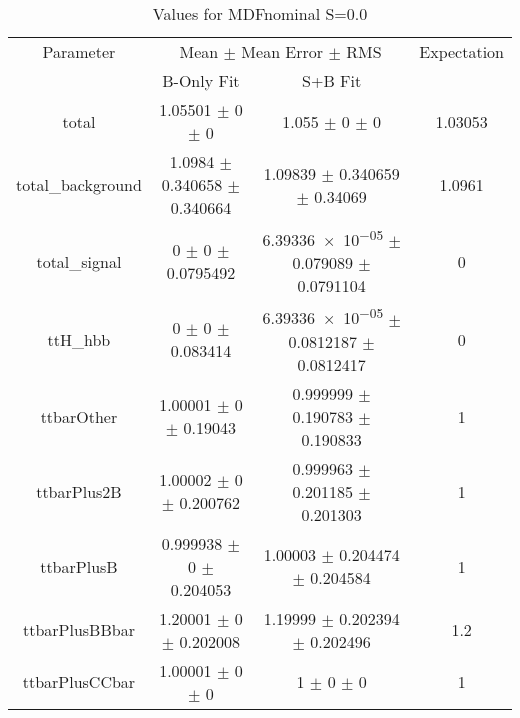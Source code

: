\begin{table}
\centering
\caption{Values for MDFnominal S=0.0}
\begin{tabular}{cccc}
\toprule
Parameter & \multicolumn{2}{c}{Mean $\pm$ Mean Error $\pm$ RMS} & Expectation\\
 & B-Only Fit & S+B Fit & \\
\midrule
total & \num{1.05501} $\pm$ \num{0} $\pm$ \num{0} & \num{1.055} $\pm$ \num{0} $\pm$ \num{0} & \num{1.03053}\\
total\_background & \num{1.0984} $\pm$ \num{0.340658} $\pm$ \num{0.340664} & \num{1.09839} $\pm$ \num{0.340659} $\pm$ \num{0.34069} & \num{1.0961}\\
total\_signal & \num{0} $\pm$ \num{0} $\pm$ \num{0.0795492} & \num{6.39336e-05} $\pm$ \num{0.079089} $\pm$ \num{0.0791104} & \num{0}\\
ttH\_hbb & \num{0} $\pm$ \num{0} $\pm$ \num{0.083414} & \num{6.39336e-05} $\pm$ \num{0.0812187} $\pm$ \num{0.0812417} & \num{0}\\
ttbarOther & \num{1.00001} $\pm$ \num{0} $\pm$ \num{0.19043} & \num{0.999999} $\pm$ \num{0.190783} $\pm$ \num{0.190833} & \num{1}\\
ttbarPlus2B & \num{1.00002} $\pm$ \num{0} $\pm$ \num{0.200762} & \num{0.999963} $\pm$ \num{0.201185} $\pm$ \num{0.201303} & \num{1}\\
ttbarPlusB & \num{0.999938} $\pm$ \num{0} $\pm$ \num{0.204053} & \num{1.00003} $\pm$ \num{0.204474} $\pm$ \num{0.204584} & \num{1}\\
ttbarPlusBBbar & \num{1.20001} $\pm$ \num{0} $\pm$ \num{0.202008} & \num{1.19999} $\pm$ \num{0.202394} $\pm$ \num{0.202496} & \num{1.2}\\
ttbarPlusCCbar & \num{1.00001} $\pm$ \num{0} $\pm$ \num{0} & \num{1} $\pm$ \num{0} $\pm$ \num{0} & \num{1}\\
\bottomrule
\end{tabular}
\end{table}